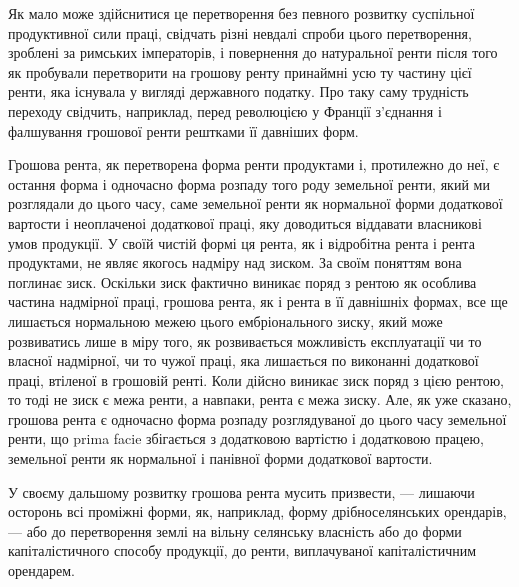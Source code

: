 \parcont{}  %
Як мало може здійснитися це перетворення без певного розвитку суспільної
продуктивної сили праці, свідчать різні невдалі спроби цього перетворення,
зроблені за римських імператорів, і повернення до натуральної ренти після
того як пробували перетворити на грошову ренту принаймні усю ту частину
цієї ренти, яка існувала у вигляді державного податку. Про таку саму трудність
переходу свідчить, наприклад, перед революцією у Франції з’єднання і
фалшування грошової ренти рештками її давніших форм.

Грошова рента, як перетворена форма ренти продуктами і, протилежно до
неї, є остання форма і одночасно форма розпаду того роду земельної ренти,
який ми розглядали до цього часу, саме земельної ренти як нормальної форми
додаткової вартости і неоплаченоі додаткової праці, яку доводиться віддавати
власникові умов продукції. У своїй чистій формі ця рента, як і відробітна
рента і рента продуктами, не являє якогось надміру над зиском. За своїм
поняттям вона поглинає зиск. Оскільки зиск фактично виникає поряд з рентою
як особлива частина надмірної праці, грошова рента, як і рента в її давнішніх
формах, все ще лишається нормальною межею цього ембріонального зиску,
який може розвиватись лише в міру того, як розвивається можливість експлуатації
чи то власної надмірної, чи то чужої праці, яка лишається по виконанні
додаткової праці, втіленої в грошовій ренті. Коли дійсно виникає зиск поряд
з цією рентою, то тоді не зиск є межа ренти, а навпаки, рента є межа зиску.
Але, як уже сказано, грошова рента є одночасно форма розпаду розглядуваної
до цього часу земельної ренти, що prima facie збігається з додатковою вартістю
і додатковою працею, земельної ренти як нормальної і панівної форми додаткової
вартости.

У своєму дальшому розвитку грошова рента мусить призвести, — лишаючи
осторонь всі проміжні форми, як, наприклад, форму дрібноселянських
орендарів, — або до перетворення землі на вільну селянську власність або до
форми капіталістичного способу продукції, до ренти, виплачуваної капіталістичним
орендарем.

